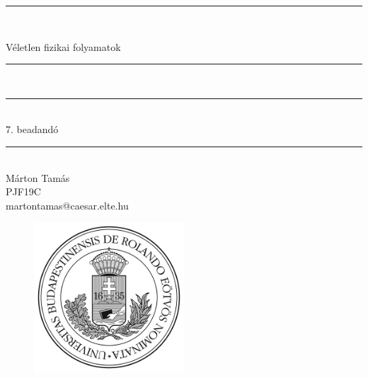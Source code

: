 \documentclass[a4paper, 12pt]{article}
\numberwithin{equation}{section}          %
\numberwithin{figure}{subsection}
\begin{document}
\begin{titlepage}   
\begin{center}
\thispagestyle{empty}  

\vspace*{0.7cm}
\rule{\linewidth}{0.5mm} \\[3mm]
\vspace*{0.7cm}

{\LARGE Véletlen fizikai folyamatok}

\vspace*{0.7cm}
\rule{\linewidth}{0.5mm} \\[3mm]
\rule{\linewidth}{0.5mm} \\[3mm]



{\Large 7. beadandó\\}

\vspace*{0.7cm}
\rule{\linewidth}{0.5mm} \\[3mm]
  {\small Márton Tamás} \\[3mm]
{\footnotesize PJF19C} \\
{\footnotesize martontamas@caesar.elte.hu}

  \vspace*{2cm}

\begin{figure}[h!]
\begin{center}
\includegraphics[width=0.5\textwidth]{./elte.png}
\end{center}
\end{figure}

\end{center}
\end{titlepage}
\end{document}

